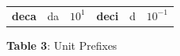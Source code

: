 {{\begin{center}
\begin{xtabular}[t]{|l|l|l|l|l|l|}
                \textbf{deca}
               &
    
    
        da &
    
    
        
                \begin{math}{10}^{1}\end{math}
               &
    
    
        
                \textbf{deci}
               &
    
    
        d &
    
    
        
                \begin{math}{10}^{-1}\end{math}
     \tabularnewline{}
    \end{xtabular}
      \end{center}
    \begin{center}{\small\bfseries Table 3}: Unit Prefixes\end{center}
    
    \addtocounter{footnote}{-0}
    
          } %
        }{%
        }
